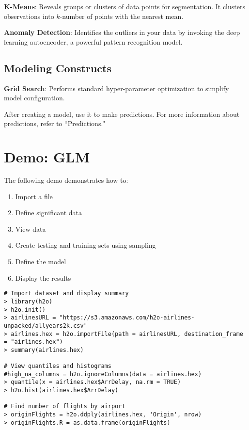 {{\textbf{K-Means}}: Reveals groups or clusters of data points for segmentation. It clusters observations into $k$-number of points with the nearest mean.

{\textbf{Anomaly Detection}}: Identifies the outliers in your data by invoking the deep learning autoencoder, a powerful pattern recognition model.

\subsection{Modeling Constructs}

{\textbf{Grid Search}}: Performs standard hyper-parameter optimization to simplify model configuration. %

After creating a model, use it to make predictions. For more information about predictions, refer to ``Predictions." 

\newpage
\section{Demo: GLM}

The following demo demonstrates how to:

\begin{enumerate}
\item  Import a file
\item Define significant data
\item View data
\item Create testing and training sets using sampling
\item Define the model
\item Display the results
\end{enumerate}

\begin{lstlisting}[style=R]
# Import dataset and display summary
> library(h2o)
> h2o.init()
> airlinesURL = "https://s3.amazonaws.com/h2o-airlines-unpacked/allyears2k.csv"
> airlines.hex = h2o.importFile(path = airlinesURL, destination_frame = "airlines.hex")
> summary(airlines.hex)

# View quantiles and histograms
#high_na_columns = h2o.ignoreColumns(data = airlines.hex)
> quantile(x = airlines.hex$ArrDelay, na.rm = TRUE)
> h2o.hist(airlines.hex$ArrDelay)

# Find number of flights by airport
> originFlights = h2o.ddply(airlines.hex, 'Origin', nrow)
> originFlights.R = as.data.frame(originFlights)


\end{lstlisting}}

